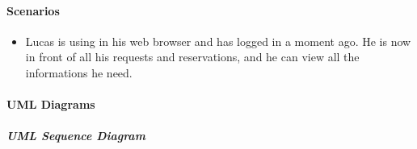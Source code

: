 \paragraph{Scenarios}
\begin{itemize}
	\item Lucas is using \myTaxiService{} in his web browser and has logged in a moment ago.
	He is now in front of all his requests and reservations, and he can view all the informations he need.
\end{itemize}
\paragraph{UML Diagrams}
\subparagraph{UML Sequence Diagram}
